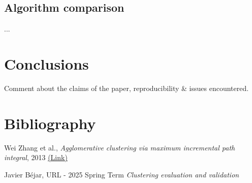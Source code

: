 \documentclass[
	10pt,
	parskip=half-,	
	paper=a4,
	english
	]{scrartcl}
\begin{document}
\subsection{Algorithm comparison}

...

\section{Conclusions}

Comment about the claims of the paper, reproducibility \& issues encountered.

\newpage
\section{Bibliography}

\renewcommand{\section}[2]{}%
\begin{thebibliography}{9}

Wei Zhang et al.,
\textit{Agglomerative clustering via maximum incremental path integral}, 2013
\href{https://www.sciencedirect.com/science/article/pii/S0031320313001830}{(Link)}

Javier Béjar,
URL - 2025 Spring Term
\textit{Clustering evaluation and validation}

\end{thebibliography}
\end{document}
